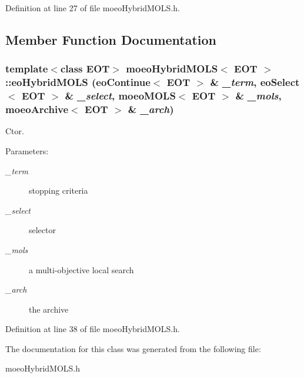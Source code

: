 Definition at line 27 of file moeo\-Hybrid\-MOLS.h.

\subsection{Member Function Documentation}
\subsubsection{\setlength{\rightskip}{0pt plus 5cm}template$<$class EOT$>$ {\bf moeo\-Hybrid\-MOLS}$<$ EOT $>$::eo\-Hybrid\-MOLS ({\bf eo\-Continue}$<$ EOT $>$ \& {\em \_\-term}, {\bf eo\-Select}$<$ EOT $>$ \& {\em \_\-select}, {\bf moeo\-MOLS}$<$ EOT $>$ \& {\em \_\-mols}, {\bf moeo\-Archive}$<$ EOT $>$ \& {\em \_\-arch})\hspace{0.3cm}{\tt  [inline]}}\label{classmoeoHybridMOLS_ced4b6d35035bfe3339dd571646e570d}


Ctor. 

\begin{Desc}
\item[Parameters:]
\begin{description}
\item[{\em \_\-term}]stopping criteria \item[{\em \_\-select}]selector \item[{\em \_\-mols}]a multi-objective local search \item[{\em \_\-arch}]the archive \end{description}
\end{Desc}


Definition at line 38 of file moeo\-Hybrid\-MOLS.h.

The documentation for this class was generated from the following file:\begin{CompactItemize}
\item 
moeo\-Hybrid\-MOLS.h\end{CompactItemize}
